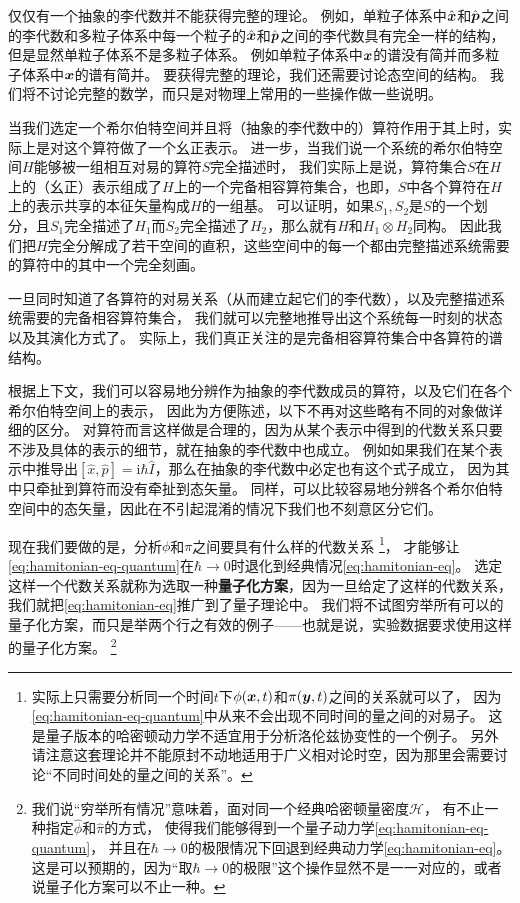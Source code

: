 \documentclass[hyperref, UTF8, a4paper]{ctexart}
\newcommand*{\ii}{\mathrm{i}}
\begin{document}
仅仅有一个抽象的李代数并不能获得完整的理论。
例如，单粒子体系中$\hat{\vb*{x}}$和$\hat{\vb*{p}}$之间的李代数和多粒子体系中每一个粒子的$\hat{\vb*{x}}$和$\hat{\vb*{p}}$之间的李代数具有完全一样的结构，但是显然单粒子体系不是多粒子体系。
例如单粒子体系中$\vb*{x}$的谱没有简并而多粒子体系中$\vb*{x}$的谱有简并。
要获得完整的理论，我们还需要讨论态空间的结构。
我们将不讨论完整的数学，而只是对物理上常用的一些操作做一些说明。

当我们选定一个希尔伯特空间并且将（抽象的李代数中的）算符作用于其上时，实际上是对这个算符做了一个幺正表示。
进一步，当我们说一个系统的希尔伯特空间$H$能够被一组相互对易的算符$S$完全描述时，
我们实际上是说，算符集合$S$在$H$上的（幺正）表示组成了$H$上的一个完备相容算符集合，也即，$S$中各个算符在$H$上的表示共享的本征矢量构成$H$的一组基。
可以证明，如果$S_1,S_2$是$S$的一个划分，且$S_1$完全描述了$H_1$而$S_2$完全描述了$H_2$，那么就有$H$和$H_1 \otimes H_2$同构。
因此我们把$H$完全分解成了若干空间的直积，这些空间中的每一个都由完整描述系统需要的算符中的其中一个完全刻画。

一旦同时知道了各算符的对易关系（从而建立起它们的李代数），以及完整描述系统需要的完备相容算符集合，
我们就可以完整地推导出这个系统每一时刻的状态以及其演化方式了。
实际上，我们真正关注的是完备相容算符集合中各算符的谱结构。

根据上下文，我们可以容易地分辨作为抽象的李代数成员的算符，以及它们在各个希尔伯特空间上的表示，
因此为方便陈述，以下不再对这些略有不同的对象做详细的区分。
对算符而言这样做是合理的，因为从某个表示中得到的代数关系只要不涉及具体的表示的细节，就在抽象的李代数中也成立。
例如如果我们在某个表示中推导出$[\hat{x}, \hat{p}] = \ii \hbar \hat{I}$，那么在抽象的李代数中必定也有这个式子成立，
因为其中只牵扯到算符而没有牵扯到态矢量。
同样，可以比较容易地分辨各个希尔伯特空间中的态矢量，因此在不引起混淆的情况下我们也不刻意区分它们。

现在我们要做的是，分析$\phi$和$\pi$之间要具有什么样的代数关系%
\footnote{实际上只需要分析同一个时间$t$下$\phi(\vb*{x}, t)$和$\pi(\vb*{y}, t)$之间的关系就可以了，
因为\eqref{eq:hamitonian-eq-quantum}中从来不会出现不同时间的量之间的对易子。
这是量子版本的哈密顿动力学不适宜用于分析洛伦兹协变性的一个例子。
另外请注意这套理论并不能原封不动地适用于广义相对论时空，因为那里会需要讨论“不同时间处的量之间的关系”。}，
才能够让\eqref{eq:hamitonian-eq-quantum}在$\hbar \to 0$时退化到经典情况\eqref{eq:hamitonian-eq}。
选定这样一个代数关系就称为选取一种\textbf{量子化方案}，因为一旦给定了这样的代数关系，我们就把\eqref{eq:hamitonian-eq}推广到了量子理论中。
我们将不试图穷举所有可以的量子化方案，而只是举两个行之有效的例子——也就是说，实验数据要求使用这样的量子化方案。%
\footnote{我们说“穷举所有情况”意味着，面对同一个经典哈密顿量密度$\mathcal{H}$，
有不止一种指定$\hat{\phi}$和$\hat{\pi}$的方式，
使得我们能够得到一个量子动力学\eqref{eq:hamitonian-eq-quantum}，
并且在$\hbar \to 0$的极限情况下回退到经典动力学\eqref{eq:hamitonian-eq}。
这是可以预期的，因为“取$\hbar\to 0$的极限”这个操作显然不是一一对应的，或者说量子化方案可以不止一种。
}
\end{document}
